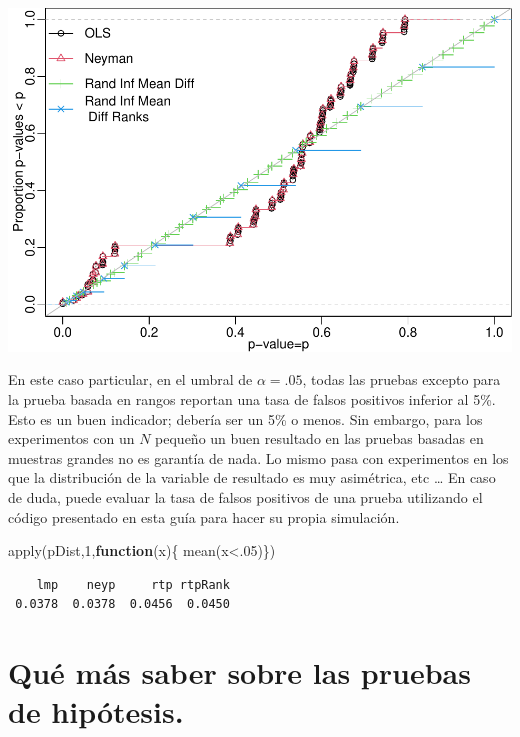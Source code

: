 \documentclass[
]{article}
\newenvironment{Shaded}{\begin{snugshade}}{\end{snugshade}}
\newcommand{\ControlFlowTok}[1]{\textcolor[rgb]{0.13,0.29,0.53}{\textbf{#1}}}
\newcommand{\DecValTok}[1]{\textcolor[rgb]{0.00,0.00,0.81}{#1}}
\newcommand{\FunctionTok}[1]{\textcolor[rgb]{0.00,0.00,0.00}{#1}}
\newcommand{\NormalTok}[1]{#1}
\newcommand{\SpecialCharTok}[1]{\textcolor[rgb]{0.00,0.00,0.00}{#1}}
\begin{document}
\includegraphics[width=.9\textwidth]{hypothesistesting_esp_files/figure-latex/unnamed-chunk-7-1}

En este caso particular, en el umbral de \(\alpha = .05\), todas las pruebas
excepto para la prueba basada en rangos reportan una tasa de falsos positivos inferior al 5\%. Esto es un buen indicador; debería ser un 5\% o menos. Sin embargo, para los experimentos con un \(N\) pequeño un buen resultado en las pruebas basadas en muestras grandes no es garantía de nada. Lo mismo pasa con experimentos en los que la distribución de la variable de resultado es muy asimétrica, etc \ldots{} En caso de duda, puede evaluar la tasa de falsos positivos de una prueba utilizando el código presentado en esta guía para hacer su propia simulación.

\begin{Shaded}
\begin{Highlighting}[]
\FunctionTok{apply}\NormalTok{(pDist,}\DecValTok{1}\NormalTok{,}\ControlFlowTok{function}\NormalTok{(x)\{ }\FunctionTok{mean}\NormalTok{(x}\SpecialCharTok{\textless{}}\NormalTok{.}\DecValTok{05}\NormalTok{)\})}
\end{Highlighting}
\end{Shaded}

\begin{verbatim}
    lmp    neyp     rtp rtpRank 
 0.0378  0.0378  0.0456  0.0450 
\end{verbatim}

\hypertarget{quuxe9-muxe1s-saber-sobre-las-pruebas-de-hipuxf3tesis.}{%
\section{Qué más saber sobre las pruebas de hipótesis.}\label{quuxe9-muxe1s-saber-sobre-las-pruebas-de-hipuxf3tesis.}}
\end{document}
